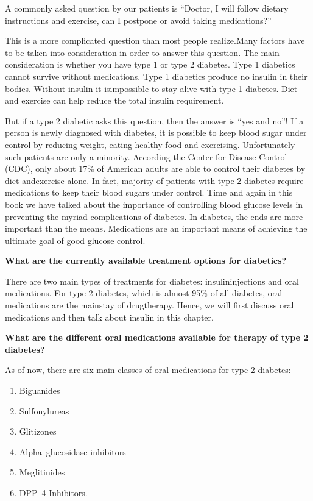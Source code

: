 A commonly asked question by our patients is “Doctor, I will follow dietary instructions and exercise, can I postpone or avoid taking medi\-cations?”

This is a more complicated question than most people realize.\break Many factors have to be taken into consideration in order to answer this question. The main consideration is whether you have type 1 or type 2 diabetes. Type 1 diabetics cannot survive without medications. Type 1 diabetics produce no insulin in their bodies. Without insulin it is\break impossible to stay alive with type 1 diabetes. Diet and exercise can help reduce the total insulin requirement.

But if a type 2 diabetic asks this question, then the answer is “yes and no”! If a person is newly diagnosed with diabetes, it is possible to keep blood sugar under control by reducing weight, eating healthy food and exercising. Unfortunately such patients are only a mino\-rity. According the Center for Disease Control (CDC), only about 17\% of American adults are able to control their diabetes by diet and\break exercise alone. In fact, majority of patients with type 2 diabetes require medications to keep their blood sugars under control. Time and again in this book we have talked about the importance of controlling blood glucose levels in preventing the myriad complications of diabetes. In diabetes, the ends are more important than the means. Medications are an important means of achieving the ultimate goal of good glucose control.

\clearpage

\noindent\textbf{What are the currently available treatment options for diabetics?}

There are two main types of treatments for diabetes: insulin\break injections and oral medications. For type 2 diabetes, which is almost 95\% of all diabetes, oral medications are the mainstay of drug\break therapy. Hence, we will first discuss oral medications and then talk about insulin in this chapter.

\vskip 6pt

\noindent\textbf{What are the different oral medications available for therapy of type 2 diabetes?}

As of now, there are six main classes of oral medications for type 2 diabetes:
\begin{enumerate}[•]
\itemsep=0pt
\item Biguanides
\item Sulfonylureas
\item Glitizones
\item Alpha–glucosidase inhibitors
\item Meglitinides
\item DPP–4 Inhibitors.
\end{enumerate}

